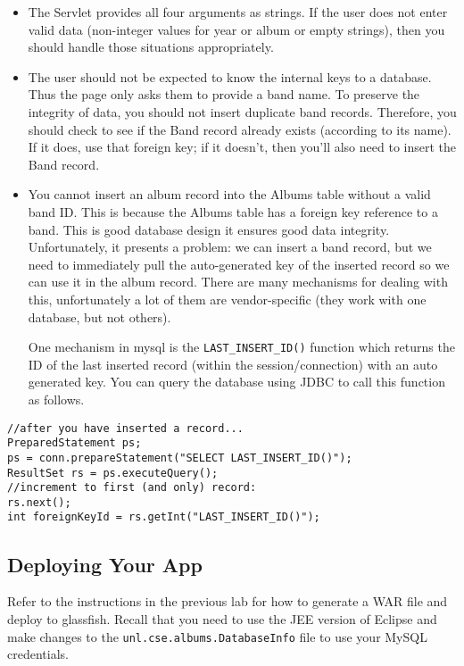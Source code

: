 \documentclass[12pt]{scrartcl}
\begin{document}
\begin{itemize}
  \item The Servlet provides all four arguments as strings.  If the
  	user does not enter valid data (non-integer values for year or
	album or empty strings), then you should handle those situations
	appropriately.
  \item The user should not be expected to know the internal keys to 
    a database.  Thus the page only asks them to provide a band name.  
    To preserve the integrity of data, you should not insert duplicate 
    band records.  Therefore, you should check to see if the Band record 
    already exists (according to its name).  If it does, use that foreign 
    key; if it doesn't, then you'll also need to insert the Band record.
  \item You cannot insert an album record into the Albums table 
    without a valid band ID.  This is because the Albums table has a 
    foreign key reference to a band.  This is good database design it 
    ensures good data integrity.  Unfortunately, it presents a problem: 
    we can insert a band record, but we need to immediately pull the 
    auto-generated key of the inserted record so we can use it in the 
    album record.  There are many mechanisms for dealing with this, 
    unfortunately a lot of them are vendor-specific (they work with one 
    database, but not others).
    
    One mechanism in mysql is the \texttt{LAST_INSERT_ID()} 
    function which returns the ID of the last inserted record (within the
    session/connection) with an auto generated key.  You can query the 
    database using JDBC to call this function as follows.
\end{itemize}
    
\begin{verbatim}
//after you have inserted a record...
PreparedStatement ps;
ps = conn.prepareStatement("SELECT LAST_INSERT_ID()");
ResultSet rs = ps.executeQuery();
//increment to first (and only) record:
rs.next();
int foreignKeyId = rs.getInt("LAST_INSERT_ID()");
\end{verbatim}

\subsection*{Deploying Your App}

Refer to the instructions in the previous lab for how to 
generate a WAR file and deploy to glassfish.  Recall that
you need to use the JEE version of Eclipse and make changes
to the \texttt{unl.cse.albums.DatabaseInfo} file
to use your MySQL credentials.
\end{document}
